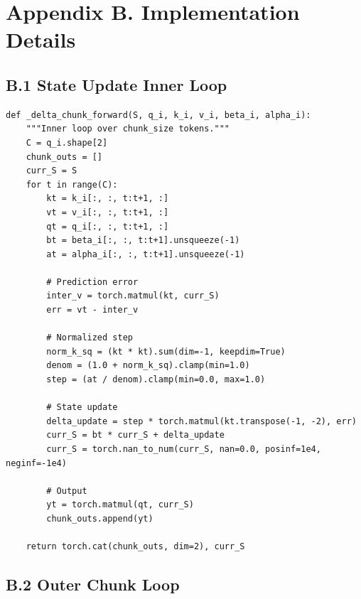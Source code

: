 
\section{Appendix B. Implementation Details}

\subsection{B.1 State Update Inner Loop}

\begin{lstlisting}
def _delta_chunk_forward(S, q_i, k_i, v_i, beta_i, alpha_i):
    """Inner loop over chunk_size tokens."""
    C = q_i.shape[2]
    chunk_outs = []
    curr_S = S
    for t in range(C):
        kt = k_i[:, :, t:t+1, :]
        vt = v_i[:, :, t:t+1, :]
        qt = q_i[:, :, t:t+1, :]
        bt = beta_i[:, :, t:t+1].unsqueeze(-1)
        at = alpha_i[:, :, t:t+1].unsqueeze(-1)
        
        # Prediction error
        inter_v = torch.matmul(kt, curr_S)
        err = vt - inter_v
        
        # Normalized step
        norm_k_sq = (kt * kt).sum(dim=-1, keepdim=True)
        denom = (1.0 + norm_k_sq).clamp(min=1.0)
        step = (at / denom).clamp(min=0.0, max=1.0)
        
        # State update
        delta_update = step * torch.matmul(kt.transpose(-1, -2), err)
        curr_S = bt * curr_S + delta_update
        curr_S = torch.nan_to_num(curr_S, nan=0.0, posinf=1e4, neginf=-1e4)
        
        # Output
        yt = torch.matmul(qt, curr_S)
        chunk_outs.append(yt)
    
    return torch.cat(chunk_outs, dim=2), curr_S
\end{lstlisting}

\subsection{B.2 Outer Chunk Loop}

